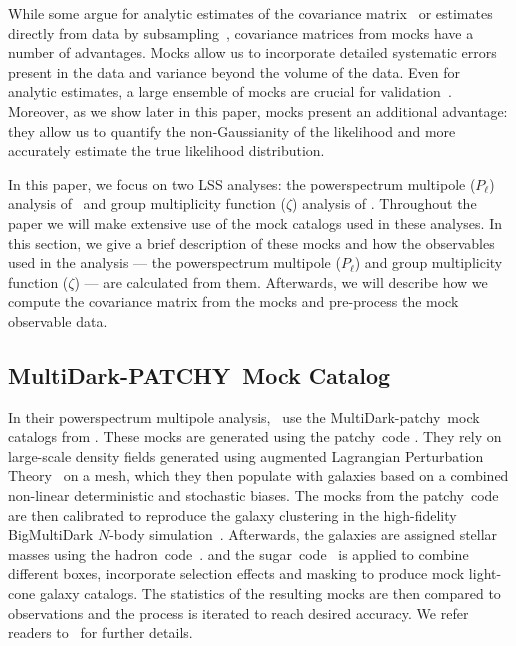 \documentclass[12pt, letterpaper, preprint]{aastex}
\newcommand{\Beut}{\citetalias{beutler2017}}
\newcommand{\Sinh}{\citetalias{sinha2017a}}
\newcommand{\patchy}{{\fontshape\scdefault\selectfont patchy}}
\begin{document}
While some argue for analytic estimates of the covariance 
matrix~\citep[e.g.][]{mohammed2017} or estimates directly from data
by subsampling~\citep[e.g.][]{norberg2009}, covariance matrices 
from mocks have a number of advantages. Mocks allow us 
to incorporate detailed systematic errors present in the 
data and variance beyond the volume of the data. Even for analytic 
estimates, a large ensemble of mocks are crucial for validation~\citep[\emph{e.g.}][]{slepian2017}. 
Moreover, as we show later in this paper, mocks present an
additional advantage: they allow us to 
quantify the non-Gaussianity of the likelihood and more accurately 
estimate the true likelihood distribution. 

In this paper, we focus on two LSS analyses: the powerspectrum 
multipole ($P_\ell$) analysis of \Beut~and group multiplicity 
function ($\zeta$) analysis of \Sinh. Throughout the paper we will 
make extensive use of the mock catalogs used in these analyses. 
In this section, we give a brief description of these mocks and how 
the observables used in the analysis --- the powerspectrum 
multipole ($P_\ell$) and group multiplicity function ($\zeta$) ---
are calculated from them. Afterwards, we will describe how we compute 
the covariance matrix from the mocks and pre-process the mock observable
data.

\subsection{MultiDark-PATCHY~Mock Catalog} \label{sec:patchy}
In their powerspectrum multipole analysis, \Beut~use 
the MultiDark-\patchy~mock catalogs from \cite{kitaura2016}. 
These mocks are generated using the \patchy~code \citep{kitaura2014,kitaura2015}. 
They rely on large-scale density fields generated using augmented
Lagrangian Perturbation Theory~\citep[ALPT;][]{kitaura2013} on a mesh,
which they then populate with galaxies based on a combined non-linear
deterministic and stochastic biases. The mocks from the \patchy~code 
are then calibrated to reproduce the galaxy clustering in the 
high-fidelity BigMultiDark $N$-body simulation~\citep{rodriguez-torres2016, klypin2016}. 
Afterwards, the galaxies are assigned stellar masses using the 
{\fontshape\scdefault\selectfont hadron}~code~\citep{zhao2015}.
and the {\fontshape\scdefault\selectfont sugar}~code~\citep{rodriguez-torres2016} 
is applied to combine different boxes, incorporate selection
effects and masking to produce mock light-cone galaxy catalogs. 
The statistics of the resulting mocks are then compared to 
observations and the process is iterated to reach desired 
accuracy. We refer readers to~\cite{kitaura2016} for further 
details. 
\end{document}

